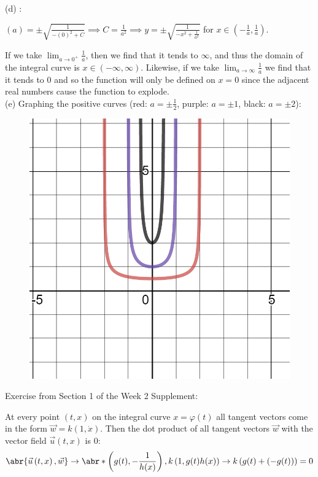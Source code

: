 \documentclass[11pt]{article}
\newcommand{\br}[1]{\left(#1\right)}
\begin{document}
(d) :

$\br{a} = \pm\sqrt{\frac{1}{-\br{0}^2 + C}} \implies C = \frac{1}{a^2} \implies y = \pm\sqrt{\frac{1}{-x^2 + \frac{1}{a^2}}}$ for $x \in \br{-\frac{1}{a},\frac{1}{a}}$.

If we take $\lim_{a\to 0^{+}} \frac{1}{a}$, then we find that it tends to $\infty$, and thus the domain of the integral curve is $x \in \br{-\infty,\infty}$. Likewise, if we take $\lim_{a\to \infty} \frac{1}{a}$ we find that it tends to $0$ and so the function will only be defined on $x=0$ since the adjacent real numbers cause the function to explode.\\

(e) Graphing the positive curves (red: $a=\pm \frac{1}{2}$, purple: $a=\pm 1$, black: $a=\pm 2$):

\begin{figure}[h]
\centering
\includegraphics[scale=0.3]{plots}
\end{figure}

\newpage
Exercise from Section 1 of the Week 2 Supplement:

At every point $\br{t,x}$ on the integral curve $x = \varphi\br{t}$ all tangent vectors come in the form $\vec{w} = k\br{1,\dot{x}}$. Then the dot product of all tangent vectors $\vec{w}$ with the vector field $\vec{u}\br{t,x}$ is 0:
\begin{equation*}
\abr{\vec{u}\br{t,x}, \vec{w}} \to \abr*{\br{g(t), -\frac{1}{h(x)}}, k\br{1,g(t)h(x)}} \to k\br{g(t) + \br{-g(t)}} = 0
\end{equation*}
\end{document}
